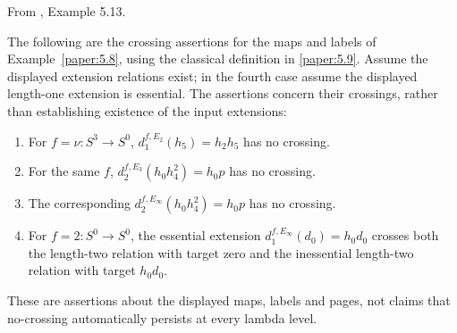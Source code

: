 \begin{proposition}
\label{paper:5.13}
\label{exam:Ercross}
From \cite{LWX126}, Example 5.13.\par
The following are the crossing assertions for the maps and labels of Example~\ref{paper:5.8}, using the classical definition in \ref{paper:5.9}. Assume the displayed extension relations exist; in the fourth case assume the displayed length-one extension is essential. The assertions concern their crossings, rather than establishing existence of the input extensions:
\begin{enumerate}
\item For $f=\nu:S^3\to S^0$, $d_1^{f,E_2}(h_5)=h_2h_5$ has no crossing.
\item For the same $f$, $d_2^{f,E_3}(h_0h_4^2)=h_0p$ has no crossing.
\item The corresponding $d_2^{f,E_\infty}(h_0h_4^2)=h_0p$ has no crossing.
\item For $f=2:S^0\to S^0$, the essential extension $d_1^{f,E_\infty}(d_0)=h_0d_0$ crosses both the length-two relation with target zero and the inessential length-two relation with target $h_0d_0$.
\end{enumerate}
These are assertions about the displayed maps, labels and pages, not claims that no-crossing automatically persists at every lambda level.
\end{proposition}
